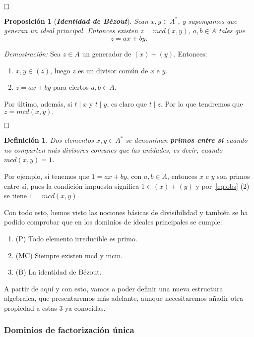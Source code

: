 \documentclass[12pt]{article}
\newtheorem{proposition}[theorem]{Proposición}
\newtheorem{definition}[theorem]{Definición}
\begin{document}
$\hfill \square$

\begin{proposition}[\textbf{\textit{Identidad de Bézout}}] Sean $x, y \in A^{\ast}$, y supongamos que generan un ideal principal. Entonces existen $z = mcd(x,y)$, $a,b \in A$ tales que $$z = ax + by.$$
\end{proposition}
\emph{Demostración: }Sea $z \in A$ un generador de $(x) + (y)$. Entonces: \begin{enumerate}
\item $x,y \in (z)$, luego $z$ es un divisor común de $x$ e $y$.
\item $z = ax + by$ para ciertos $a,b \in A$.
\end{enumerate}
Por último, además, si $t \mid x$ y $t \mid y$, es claro que $t \mid z$. Por lo que tendremos que $z = mcd(x,y).$

$\hfill \square$

\begin{definition} Dos elementos $x,y \in A^{\ast}$ se denominan \textbf{primos entre sí} cuando no comparten más divisores comunes que las unidades, es decir, cuando $mcd(x,y) = 1$.
\end{definition}

Por ejemplo, si tenemos que $1 = ax+by$, con $a,b \in A$, entonces $x$ e $y$ son primos entre sí, pues la condición impuesta significa $1 \in (x)+(y)$ y por~\ref{eq:obs} (2) se tiene $1 = mcd(x,y)$.

Con todo esto, hemos visto las nociones básicas de divisibilidad y también se ha podido comprobar que en los dominios de ideales principales se cumple: 
\begin{enumerate}
\item (P) Todo elemento irreducible es primo.
\item (MC) Siempre existen mcd y mcm.
\item (B) La identidad de Bézout.
\end{enumerate}

A partir de aquí y con esto, vamos a poder definir una nueva estructura algebraica, que presentaremos más adelante, aunque necesitaremos añadir otra propiedad a estas 3 ya conocidas.

\subsubsection{Dominios de factorización única}
\end{document}
